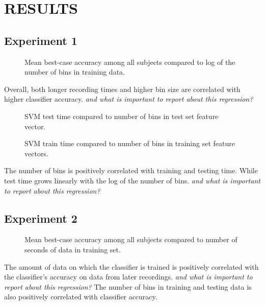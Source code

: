 \section{\uppercase{Results}}

\subsection{Experiment 1}

\begin{figure}[!h]
  \vspace{-0.2cm}
  \centering
   {}
  \caption{Mean best-case accuracy among all subjects compared to log of the number of bins in training data.}
  \label{fig:fig1}
  \vspace{-0.1cm}
 \end{figure}

Overall, both longer recording times and higher bin size are correlated with higher classifier accuracy. \textit{and what is important to report about this regression?}

\begin{figure}[!h]
  \vspace{-0.2cm}
  \centering
   {}
  \caption{SVM test time compared to number of bins in test set feature vector.}
  \label{fig:fig2}
\end{figure}

\begin{figure}[!h]
  \vspace{-0.2cm}
  \centering
   {}
  \caption{SVM train time compared to number of bins in training set feature vectors.}
  \label{fig:fig2}
  \vspace{-0.1cm}
\end{figure}


The number of bins is positively correlated with training and testing time. While test time grows linearly with the log of the number of bins. \textit{and what is important to report about this regression?}

\subsection{Experiment 2}

\begin{figure}[!h]
  \vspace{-0.2cm}
  \centering
   {}
  \caption{Mean best-case accuracy among all subjects compared to number of seconds of data in training set.}
  \label{fig:fig2}
  \vspace{-0.1cm}
\end{figure}

 The amount of data on which the classifier is trained is positively correlated with the classifier's accuracy on data from later recordings. \textit{and what is important to report about this regression?} The number of bins in training and testing data is also positively correlated with classifier accuracy.
